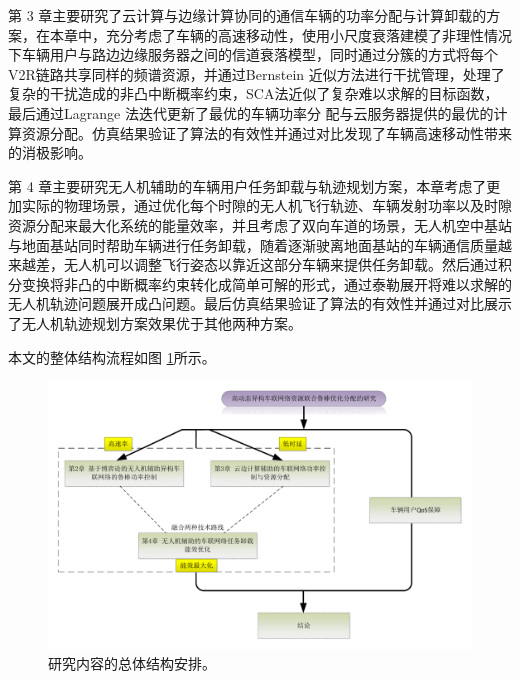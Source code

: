 第 3 章主要研究了云计算与边缘计算协同的通信车辆的功率分配与计算卸载的方案，在本章中，充分考虑了车辆的高速移动性，使用小尺度衰落建模了非理性情况下车辆用户与路边边缘服务器之间的信道衰落模型，同时通过分簇的方式将每个V2R链路共享同样的频谱资源，并通过Bernstein 近似方法进行干扰管理，处理了复杂的干扰造成的非凸中断概率约束，SCA法近似了复杂难以求解的目标函数，最后通过Lagrange 法迭代更新了最优的车辆功率分
配与云服务器提供的最优的计算资源分配。仿真结果验证了算法的有效性并通过对比发现了车辆高速移动性带来的消极影响。

第 4 章主要研究无人机辅助的车辆用户任务卸载与轨迹规划方案，本章考虑了更加实际的物理场景，通过优化每个时隙的无人机飞行轨迹、车辆发射功率以及时隙资源分配来最大化系统的能量效率，并且考虑了双向车道的场景，无人机空中基站与地面基站同时帮助车辆进行任务卸载，随着逐渐驶离地面基站的车辆通信质量越来越差，无人机可以调整飞行姿态以靠近这部分车辆来提供任务卸载。然后通过积分变换将非凸的中断概率约束转化成简单可解的形式，通过泰勒展开将难以求解的无人机轨迹问题展开成凸问题。最后仿真结果验证了算法的有效性并通过对比展示了无人机轨迹规划方案效果优于其他两种方案。

本文的整体结构流程如图 \ref{结构安排}所示。    %
\begin{figure}[H]
\centering
\includegraphics[width=16cm]{figures//chap1//总体结构安排2.pdf}
\caption{研究内容的总体结构安排。}
\label{结构安排}
\end{figure}

